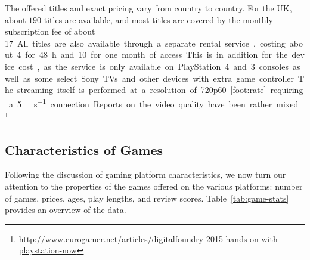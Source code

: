 The offered titles and exact pricing vary from country to country. For the UK, about $190$ titles are available, and most titles are covered by the monthly subscription fee of about \SI{17}[\EUR]. All titles are also available through a separate rental service, costing about \SI{4}[\EUR] for \SI{48}{\hour} and \SI{10}[\EUR] for one month of access. This is in addition for the device cost, as the service is only available on  PlayStation 4 and 3 consoles as well as some select Sony TVs and other devices with extra game controller.


The streaming itself is performed at a resolution of 720p60\cref{foot:rate} requiring a \SI{5}{\mega\bit\per\second} connection. Reports on the video quality have been rather mixed.\footnote{\url{http://www.eurogamer.net/articles/digitalfoundry-2015-hands-on-with-playstation-now}} %





\subsection{Characteristics of Games}

Following the discussion of gaming platform characteristics, we now turn our attention to the properties of the games offered on the various platforms: number of games, prices, ages, play lengths, and review scores. Table~\ref{tab:game-stats} provides an overview of the data.


